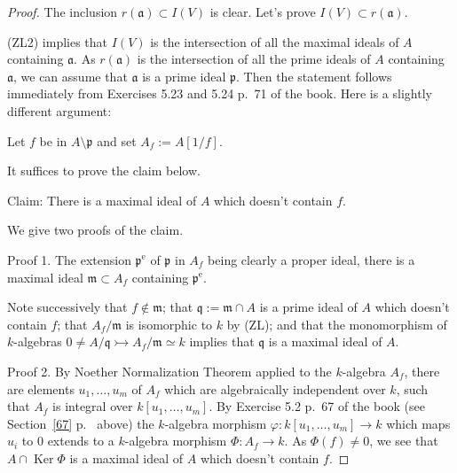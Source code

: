 \documentclass[parskip=half,fontsize=12pt]{scrartcl}%
\newcommand{\oo}{\operatorname}\newcommand{\ooo}{\operatorname*}
\newcommand{\mf}{\mathfrak}
\newcommand{\ppp}{\mf p}
\newcommand{\mono}{\rightarrowtail}
\begin{document}
\begin{proof} 
The inclusion $r(\mf a)\subset I(V)$ is clear. Let's prove $I(V)\subset r(\mf a)$. 

(ZL2) implies that $I(V)$ is the intersection of all the maximal ideals of $A$ containing $\mf a$. As $r(\mf a)$ is the intersection of all the prime ideals of $A$ containing $\mf a$, we can assume that $\mf a$ is a prime ideal $\ppp$. Then the statement follows immediately from Exercises 5.23 and 5.24 p.~71 of the book. Here is a slightly different argument:

Let $f$ be in $A\setminus\ppp$ and set $A_f:=A[1/f]$.

It suffices to prove the claim below.

Claim: There is a maximal ideal of $A$ which doesn't contain $f$. 

We give two proofs of the claim.

Proof 1. The extension $\ppp^{\oo e}$ of $\ppp$ in $A_f$ being clearly a proper ideal, there is a maximal ideal $\mf m\subset A_f$ containing $\ppp^{\oo e}$. 

Note successively that $f\notin\mf m$; that $\mf q:=\mf m\cap A$ is a prime ideal of $A$ which doesn't contain $f$; that $A_f/\mf m$ is isomorphic to $k$ by (ZL); and that the monomorphism of $k$-algebras $0\ne A/\mf q\mono A_f/\mf m\simeq k$ implies that $\mf q$ is a maximal ideal of $A$.

Proof 2. By Noether Normalization Theorem applied to the $k$-algebra $A_f$, there are elements $u_1,\dots,u_m$ of $A_f$ which are algebraically independent over $k$, such that $A_f$ is integral over $k[u_1,\dots,u_m]$. By Exercise 5.2 %
p.~67 of the book (see Section~\ref{67} p.~\pageref{67} above) the $k$-algebra morphism $\varphi:k[u_1,\dots,u_m]\to k$ which maps $u_i$ to $0$ extends to a $k$-algebra morphism $\Phi:A_f\to k$. As $\Phi(f)\ne0$, we see that $A\cap\oo{Ker}\Phi$ is a maximal ideal of $A$ which doesn't contain $f$.
\end{proof}
\end{document}
